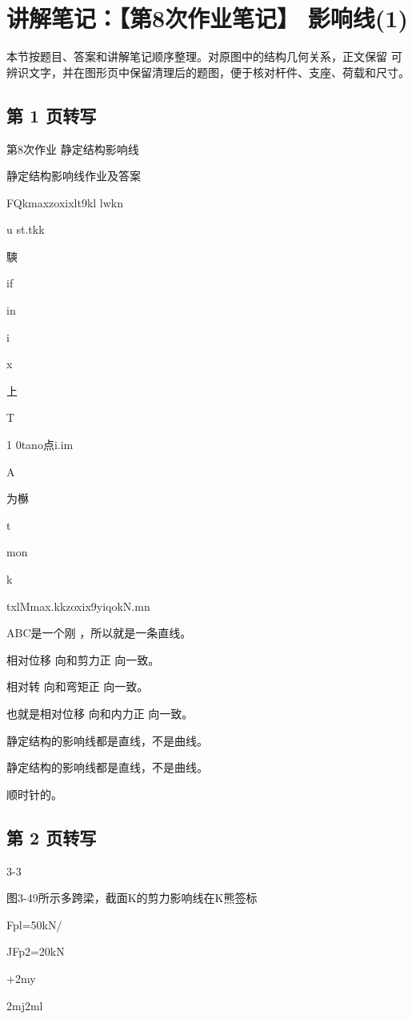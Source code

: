 \section{讲解笔记：【第8次作业笔记】 影响线(1)}
\begin{analysisbox}
本节按题目、答案和讲解笔记顺序整理。对原图中的结构几何关系，正文保留 可辨识文字，并在图形页中保留清理后的题图，便于核对杆件、支座、荷载和尺寸。
\end{analysisbox}
\subsection*{第 1 页转写}
第8次作业  静定结构影响线

静定结构影响线作业及答案

FQkmaxzoxixlt9kl lwkn

u st.tkk

騻

if

in

i

x



上

T

1 0tano点i.im

A

为櫯

t

mon

k

txlMmax.kkzoxix9yiqokN.mn

ABC是一个刚 ，所以就是一条直线。

相对位移 向和剪力正 向一致。

相对转  向和弯矩正 向一致。

也就是相对位移 向和内力正 向一致。

静定结构的影响线都是直线，不是曲线。

静定结构的影响线都是直线，不是曲线。

顺时针的。

\subsection*{第 2 页转写}
3-3

图3-49所示多跨梁，截面K的剪力影响线在K熊签标

Fpl=50kN/

JFp2=20kN

+2my

 2mj2ml

